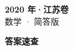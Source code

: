 \documentclass[zihao=-4, a4paper]{ctexart}
\begin{document}
\begin{center}
  {\Large\bfseries 2020 年·江苏卷}\\[4pt]
  {\large 数学 · 简答版}
\end{center}
\medskip
{}

\clearpage
{}
\begin{center}{\Large\bfseries 答案速查}\end{center}
\medskip

\end{document}
